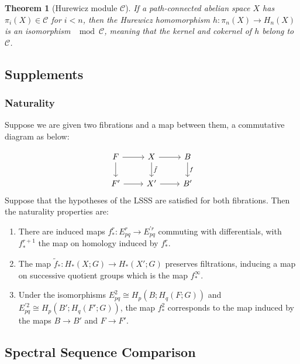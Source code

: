 \documentclass[reqno]{amsart}
\newtheorem{theorem}{Theorem}[section]
\theoremstyle{definition}
\theoremstyle{remark}
\begin{document}
\begin{theorem}[Hurewicz module $\mathcal{C}$]
    If a path-connected abelian space
    $X$ has $\pi_i (X) \in \mathcal{C}$ for $i < n$, then
    the Hurewicz homomorphism $h \colon
    \pi_n (X) \to H_n(X)$ is an isomorphism
    $\mod \mathcal{C}$, meaning
    that the kernel and cokernel of $h$ belong
    to $\mathcal{C}$.
\end{theorem}

\subsection{Supplements}

\subsubsection{Naturality}

Suppose we are given two fibrations
and a map between them, a commutative diagram as
below:

\begin{equation*}
\begin{tikzcd}
    F \ar[r] \ar[d] & X \ar[r] \ar[d, "\tilde{f}"] &
    B \ar[d, "f"] \\
    F' \ar[r] & X' \ar[r] & B'
\end{tikzcd}
\end{equation*}
Suppose that the hypotheses of the LSSS are satisfied
for both fibrations. Then the naturality properties are:
\begin{enumerate}
    \item There are induced maps
        $f_*^{r} \colon E_{pq}^{r} \to 
        E_{pq}^{'r}$ commuting with differentials, with
        $f_*^{r+1}$ the map on homology induced by
        $f_*^{r}$.
    \item The map $\tilde{f}_* \colon
        H_* (X;G) \to H_* (X';G)$ preserves filtrations,
        inducing a map on successive quotient groups
        which is the map $f_*^{\infty}$.
    \item Under the isomorphisms
        $E_{pq}^2 \cong
        H_p (B; H_q(F;G))$ and
        $E_{pq}^{'2} \cong
        H_p (B'; H_q(F';G))$, the map
        $f_*^2$ corresponds to the map induced by
        the maps $B \to B'$ and $F \to F'$.
\end{enumerate}

\subsection{Spectral Sequence Comparison}
\end{document}
